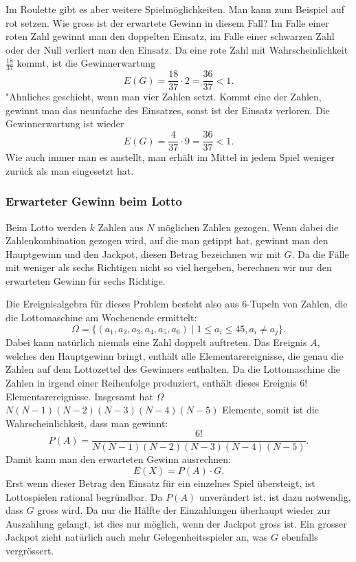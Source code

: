 Im Roulette gibt es aber weitere Spielmöglichkeiten.
Man kann zum Beispiel
auf rot setzen.
Wie gross ist der erwartete Gewinn in diesem Fall?
Im Falle einer roten Zahl gewinnt man den doppelten Einsatz,
im Falle einer schwarzen Zahl oder der Null verliert man den Einsatz.
Da eine rote Zahl mit Wahrscheinlichkeit $\frac{18}{37}$ kommt, ist
die Gewinnerwartung 
\[
E(G)=\frac{18}{37}\cdot 2=\frac{36}{37}<1.
\]
"Ahnliches geschieht, wenn man vier Zahlen setzt.
Kommt eine der Zahlen,
gewinnt man das neunfache des Einsatzes, sonst ist der Einsatz 
verloren.
Die Gewinnerwartung ist wieder
\[
E(G)=\frac{4}{37}\cdot 9=\frac{36}{37}<1.
\]
Wie auch immer man es anstellt, man erhält im Mittel in jedem Spiel
weniger zurück als man eingesetzt hat.

\subsubsection{Erwarteter Gewinn beim Lotto}
Beim Lotto werden $k$ Zahlen aus $N$ möglichen Zahlen gezogen.
Wenn dabei die Zahlenkombination gezogen wird, auf die man getippt
hat, gewinnt man den Hauptgewinn und den Jackpot, diesen Betrag bezeichnen
wir mit $G$.
Da die Fälle mit
weniger als sechs Richtigen nicht so viel hergeben, berechnen wir
nur den erwarteten Gewinn für sechs Richtige.

Die Ereignisalgebra für dieses Problem besteht also aus 
6-Tupeln von Zahlen, die die Lottomaschine am Wochenende ermittelt:
\[
\Omega=\{(a_1, a_2, a_3, a_4, a_5, a_6)\;|\;1\le a_i\le 45, a_i\ne a_j\}.
\]
Dabei kann natürlich niemals eine Zahl doppelt auftreten.
Das Ereignis $A$, welches den Hauptgewinn bringt, enthält alle
Elementarereignisse, die genau die Zahlen auf dem Lottozettel des
Gewinners enthalten.
Da die Lottomaschine die Zahlen in irgend einer
Reihenfolge produziert, enthält dieses Ereignis $6!$ Elementarereignisse.
Insgesamt hat $\Omega$ $N(N-1)(N-2)(N-3)(N-4)(N-5)$ Elemente, somit ist
die Wahrscheinlichkeit, dass man gewinnt:
\[
P(A)=\frac{6!}{N(N-1)(N-2)(N-3)(N-4)(N-5)}.
\]
Damit
kann man den erwarteten Gewinn ausrechnen:
\[
E(X) = P(A)\cdot G.
\]
Erst wenn dieser Betrag den Einsatz für ein einzelnes Spiel übersteigt,
ist Lottospielen rational begründbar.
Da $P(A)$ unverändert ist,
ist dazu notwendig, dass $G$ gross wird.
Da nur die Hälfte der
Einzahlungen überhaupt wieder zur Auszahlung gelangt, ist dies nur
möglich, wenn der Jackpot gross ist.
Ein grosser Jackpot zieht natürlich
auch mehr Gelegenheitsspieler an, was $G$ ebenfalls vergrössert.
